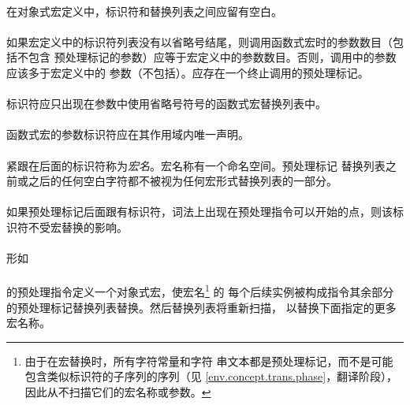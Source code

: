 {\paragraph{}
在对象式宏定义中，标识符和替换列表之间应留有空白。

\paragraph{}
如果宏定义中的标识符列表没有以省略号结尾，则调用函数式宏时的参数数目（包括不包含
预处理标记的参数）应等于宏定义中的参数数目。否则，调用中的参数应该多于宏定义中的
参数（不包括）。应存在一个\tm{)}终止调用的预处理标记。

\paragraph{}
标识符应只出现在参数中使用省略号符号的函数式宏替换列表中。

\paragraph{}
函数式宏的参数标识符应在其作用域内唯一声明。

\semantic
\paragraph{}
紧跟在后面的标识符称为\textit{宏名}。宏名称有一个命名空间。预处理标记
替换列表之前或之后的任何空白字符都不被视为任何宏形式替换列表的一部分。

\paragraph{}
如果预处理标记\tm{\#}后面跟有标识符，词法上出现在预处理指令可以开始的点，则该标
识符不受宏替换的影响。

\paragraph{}
形如                                                                          \\
\mbox{\hspace{4em} }   \\
的预处理指令定义一个对象式宏，使宏名\footnote{由于在宏替换时，所有字符常量和字符
串文本都是预处理标记，而不是可能包含类似标识符的子序列的序列（见
\ref{env.concept.trans.phase}，翻译阶段），因此从不扫描它们的宏名称或参数。} 的
每个后续实例被构成指令其余部分的预处理标记替换列表替换。然后替换列表将重新扫描，
以替换下面指定的更多宏名称。

}
